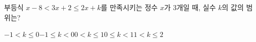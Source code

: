 부등식 $x-8<3x+2\le 2x+k$를 만족시키는 정수 $x$가 $3$개일 때, 실수 $k$의 값의 범위는?
\begin{choices32}{$-1<k\le 0$}{$-1\le k<0$}{$0<k\le 1$}{$0\le k<1$}{$1<k\le 2$}\end{choices32}
